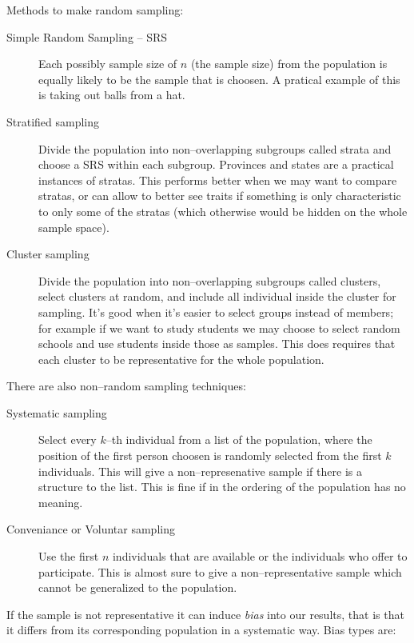 Methods to make random sampling: 

\begin{description}
  \item[Simple Random Sampling -- SRS] Each possibly sample size of $n$ (the
  sample size) from the population is equally likely to be the sample that is
  choosen. A pratical example of this is taking out balls from a hat. 
  \item[Stratified sampling] Divide the population into non--overlapping
  subgroups called strata and choose a SRS within each subgroup. Provinces and
  states are a practical instances of stratas. This performs better when we may
  want to compare stratas, or can allow to better see traits if something is
  only characteristic to only some of the stratas (which otherwise would be
  hidden on the whole sample space).
  \item[Cluster sampling] Divide the population into non--overlapping subgroups
  called clusters, select clusters at random, and include all individual inside
  the cluster for sampling. It's good when it's easier to select groups instead
  of members; for example if we want to study students we may choose to select
  random schools and use students inside those as samples. This does requires
  that each cluster to be representative for the whole population.
\end{description}

There are also non--random sampling techniques:

\begin{description}
  \item[Systematic sampling] Select every $k$--th individual from a list of the
  population, where the position of the first person choosen is randomly
  selected from the first $k$ individuals. This will give a non--represenative
  sample if there is a structure to the list. This is fine if in the ordering of
  the population has no meaning.
  \item[Conveniance or Voluntar sampling] Use the first $n$ individuals that are
  available or the individuals who offer to participate. This is almost sure to
  give a non--representative sample which cannot be generalized to the
  population.
\end{description}

If the sample is not representative it can induce \emph{bias} into our results,
that is that it differs from its corresponding population in a systematic way.
Bias types are:

